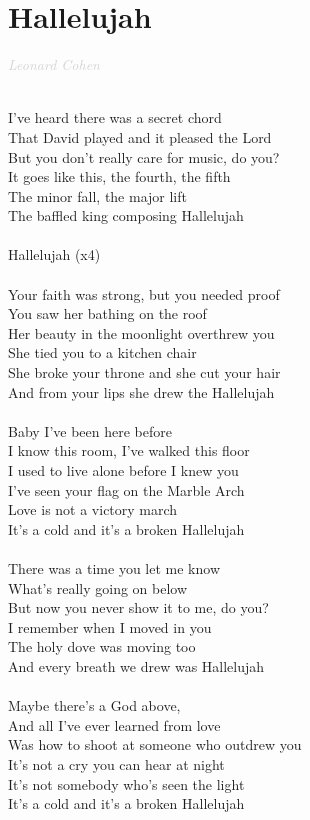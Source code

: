 \documentclass[a5paper, 10pt]{book}
\begin{document}
\section{Hallelujah}\textcolor{lightgray}{\textit{Leonard Cohen}}\\~\\
\begin{minipage}[t]{0.8\textwidth}
I’ve heard there was a secret chord\\
That David played and it pleased the Lord\\
But you don’t really care for music, do you?\\
It goes like this, the fourth, the fifth\\
The minor fall, the major lift\\
The baffled king composing Hallelujah\\
\\
\hspace*{6mm}Hallelujah (x4)\\
\\
Your faith was strong, but you needed proof\\
You saw her bathing on the roof\\
Her beauty in the moonlight overthrew you\\
She tied you to a kitchen chair\\
She broke your throne and she cut your hair\\
And from your lips she drew the Hallelujah\\
\\
Baby I’ve been here before\\
I know this room, I’ve walked this floor\\
I used to live alone before I knew you\\
I’ve seen your flag on the Marble Arch\\
Love is not a victory march\\
It’s a cold and it’s a broken Hallelujah\\
\\
There was a time you let me know\\
What’s really going on below\\
But now you never show it to me, do you?\\
I remember when I moved in you\\
The holy dove was moving too\\
And every breath we drew was Hallelujah\\
\\
Maybe there’s a God above,\\
And all I’ve ever learned from love\\
Was how to shoot at someone who outdrew you\\
It’s not a cry you can hear at night\\
It’s not somebody who’s seen the light\\
It’s a cold and it’s a broken Hallelujah\\

\end{minipage}
\end{document}
